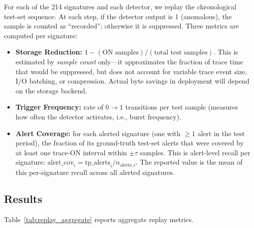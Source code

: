 \documentclass[a4paper,fleqn]{cas-sc}
\theoremstyle{plain}
\begin{document}
For each of the 214 signatures and each detector, we replay the chronological
test-set sequence.
At each step, if the detector output is 1 (anomalous), the sample is counted
as ``recorded''; otherwise it is suppressed.
Three metrics are computed per signature:
\begin{itemize}
  \item \textbf{Storage Reduction:} $1 - (\text{ON samples}) / (\text{total test samples})$.
    This is estimated by \emph{sample count} only---it approximates the fraction of
    trace time that would be suppressed, but does not account for variable trace
    event size, I/O batching, or compression.  Actual byte savings in deployment
    will depend on the storage backend.
  \item \textbf{Trigger Frequency:} rate of $0 \to 1$ transitions per test sample
    (measures how often the detector activates, i.e., burst frequency).
  \item \textbf{Alert Coverage:} for each alerted signature (one with $\geq 1$
    alert in the test period), the fraction of its ground-truth test-set alerts
    that were covered by at least one trace-ON interval within $\pm\tau$ samples.
    This is alert-level recall per signature:
    $\text{alert\_cov}_i = \text{tp\_alerts}_i / n_{\text{alerts},i}$.
    The reported value is the mean of this per-signature recall across all alerted
    signatures.
\end{itemize}

\subsection{Results}\label{sec:replay:results}

Table~\ref{tab:replay_aggregate} reports aggregate replay metrics.

\begin{table}[tbp]
\centering
{}
\caption{Trace-on replay aggregate metrics across 214 signatures
  for the four statistical detectors.
  136 of 214 signatures have $\geq 1$ alert in the test set.
  Best storage reduction in bold; best coverage in bold.}
\label{tab:replay_aggregate}
\end{table}
\end{document}
